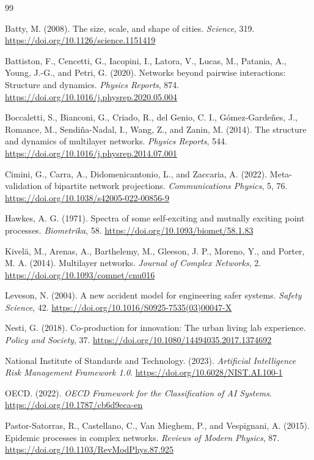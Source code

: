 \documentclass[11pt,a4paper]{article}
\begin{document}
\begin{thebibliography}{99}

Batty, M. (2008).
The size, scale, and shape of cities.
\textit{Science}, 319.
\url{https://doi.org/10.1126/science.1151419}

Battiston, F., Cencetti, G., Iacopini, I., Latora, V., Lucas, M., Patania, A., Young, J.-G., and Petri, G. (2020).
Networks beyond pairwise interactions: Structure and dynamics.
\textit{Physics Reports}, 874.
\url{https://doi.org/10.1016/j.physrep.2020.05.004}

Boccaletti, S., Bianconi, G., Criado, R., del Genio, C. I., Gómez-Gardeñes, J., Romance, M., Sendiña-Nadal, I., Wang, Z., and Zanin, M. (2014).
The structure and dynamics of multilayer networks.
\textit{Physics Reports}, 544.
\url{https://doi.org/10.1016/j.physrep.2014.07.001}

Cimini, G., Carra, A., Didomenicantonio, L., and Zaccaria, A. (2022).
Meta-validation of bipartite network projections.
\textit{Communications Physics}, 5, 76.
\url{https://doi.org/10.1038/s42005-022-00856-9}

Hawkes, A. G. (1971).
Spectra of some self-exciting and mutually exciting point processes.
\textit{Biometrika}, 58.
\url{https://doi.org/10.1093/biomet/58.1.83}

Kivelä, M., Arenas, A., Barthelemy, M., Gleeson, J. P., Moreno, Y., and Porter, M. A. (2014).
Multilayer networks.
\textit{Journal of Complex Networks}, 2.
\url{https://doi.org/10.1093/comnet/cnu016}

Leveson, N. (2004).
A new accident model for engineering safer systems.
\textit{Safety Science}, 42.
\url{https://doi.org/10.1016/S0925-7535(03)00047-X}

Nesti, G. (2018).
Co-production for innovation: The urban living lab experience.
\textit{Policy and Society}, 37.
\url{https://doi.org/10.1080/14494035.2017.1374692}

National Institute of Standards and Technology. (2023).
\textit{Artificial Intelligence Risk Management Framework 1.0}.
\url{https://doi.org/10.6028/NIST.AI.100-1}

OECD. (2022).
\textit{OECD Framework for the Classification of AI Systems}.
\url{https://doi.org/10.1787/cb6d9eca-en}

Pastor-Satorras, R., Castellano, C., Van Mieghem, P., and Vespignani, A. (2015).
Epidemic processes in complex networks.
\textit{Reviews of Modern Physics}, 87.
\url{https://doi.org/10.1103/RevModPhys.87.925}


\end{thebibliography}
\end{document}
